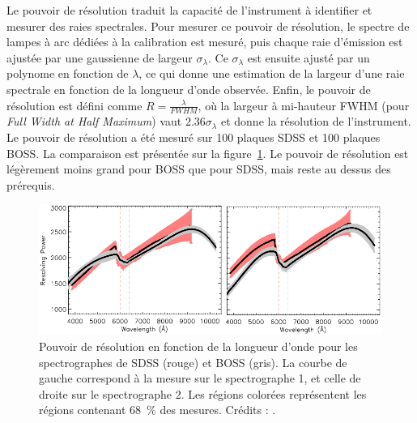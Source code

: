 Le pouvoir de résolution traduit la capacité de l'instrument à identifier et mesurer des raies spectrales. Pour mesurer ce pouvoir de résolution, le spectre de lampes à arc dédiées à la calibration est mesuré, puis chaque raie d'émission est ajustée par une gaussienne de largeur $\sigma_\lambda$. Ce $\sigma_\lambda$ est ensuite ajusté par un polynome en fonction de $\lambda$, ce qui donne une estimation de la largeur d'une raie spectrale en fonction de la longueur d'onde observée.
Enfin, le pouvoir de résolution est défini comme $R = \frac{\lambda}{FWHM}$, où la largeur à mi-hauteur FWHM (pour \emph{Full Width at Half Maximum}) vaut $\num{2.36}\sigma_{\lambda}$ et donne la résolution de l'instrument.
Le pouvoir de résolution a été mesuré sur \num{100} plaques SDSS et \num{100} plaques BOSS. La comparaison est présentée sur la figure~\ref{fig:SpectroResoPower}. Le pouvoir de résolution est légèrement moins grand pour BOSS que pour SDSS, mais reste au dessus des prérequis.
\begin{figure}
  \centering
  \includegraphics[scale=0.5]{SpectroResoPower}
  \caption{Pouvoir de résolution en fonction de la longueur d'onde pour les spectrographes de SDSS (rouge) et BOSS (gris). La courbe de gauche correspond à la mesure sur le spectrographe 1, et celle de droite sur le spectrographe 2. Les régions colorées représentent les régions contenant \SI{68}{\percent} des mesures. Crédits : \textcite{Smee2012}.}
  \label{fig:SpectroResoPower}
\end{figure}


\newpage
